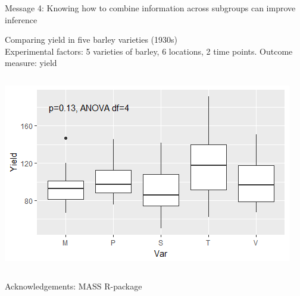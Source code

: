 \documentclass{beamer}
\begin{document}
\begin{frame}{Message 4: Knowing how to combine information across subgroups  can improve inference}
 
 \pause 
 
 Comparing yield in five barley varieties (1930s) \\
 Experimental factors: 5 varieties of barley, 6 locations, 2 time points. Outcome measure: yield
  \begin{columns}
    \begin{column}{0.6\textwidth}
	\begin{center}
	\includegraphics[width=\textwidth]{Figures/message4a}
	\end{center}
    \end{column}
    
    \begin{column}{0.4\textwidth}
  
    \end{column}
  \end{columns}
      \tiny Acknowledgements: MASS R-package
   
\end{frame}
\end{document}
